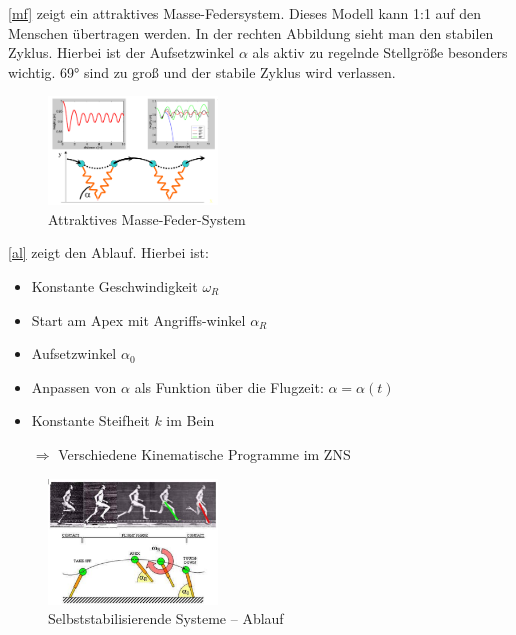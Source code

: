\autoref{mf} zeigt ein attraktives Masse-Federsystem. Dieses Modell kann 1:1 auf den Menschen übertragen werden. In der rechten Abbildung sieht man den stabilen Zyklus. Hierbei ist der Aufsetzwinkel $\alpha$ als aktiv zu regelnde Stellgröße besonders wichtig. 69° sind zu groß und der stabile Zyklus wird verlassen. 
\begin{figure}[h!]
	\centering
	\includegraphics[width=0.4\textwidth]{figures/ch06_masse-feder.png}
	\caption{Attraktives Masse-Feder-System}
	\label{mf}
\end{figure}
\autoref{al} zeigt den Ablauf. Hierbei ist:
\begin{itemize}
\item Konstante Geschwindigkeit $\omega_R$
\item Start am Apex mit Angriffs-winkel $\alpha_R$
\item Aufsetzwinkel $\alpha_0$
\item Anpassen von $\alpha$ als Funktion über die Flugzeit: $\alpha=\alpha(t)$
\item Konstante Steifheit $k$ im Bein
\item[$\Rightarrow$] Verschiedene \glqq Kinematische Programme\grqq{} im ZNS
\end{itemize}
\begin{figure}[h!]
	\centering
	\includegraphics[width=0.4\textwidth]{figures/ch06_ablauf.png}
	\caption{Selbststabilisierende Systeme -- Ablauf}
	\label{al}
\end{figure}

